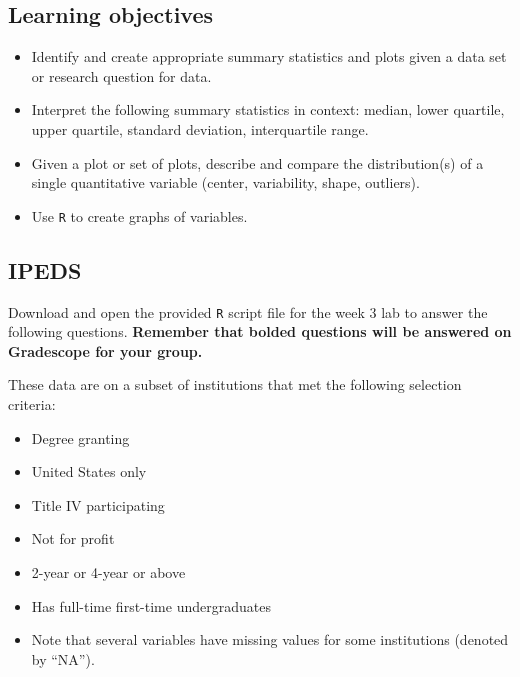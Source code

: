 \documentclass[
]{report}
\begin{document}

\hypertarget{learning-objectives-1}{%
\subsection{Learning objectives}\label{learning-objectives-1}}

\begin{itemize}
\item
  Identify and create appropriate summary statistics and plots
  given a data set or research question for data.
\item
  Interpret the following summary statistics in context:
  median, lower quartile, upper quartile,
  standard deviation, interquartile range.
\item
  Given a plot or set of plots, describe and compare the distribution(s)
  of a single quantitative variable
  (center, variability, shape, outliers).
\item
  Use \texttt{R} to create graphs of variables.
\end{itemize}

\hypertarget{ipeds}{%
\subsection{IPEDS}\label{ipeds}}

Download and open the provided \texttt{R} script file for the week 3 lab to answer the following questions. \textbf{Remember that bolded questions will be answered on Gradescope for your group.}

These data are on a subset of institutions that met the following selection criteria:

\begin{itemize}
\item
  Degree granting
\item
  United States only
\item
  Title IV participating
\item
  Not for profit
\item
  2-year or 4-year or above
\item
  Has full-time first-time undergraduates
\item
  Note that several variables have missing values for some institutions (denoted by ``NA'').
\end{itemize}
\end{document}
